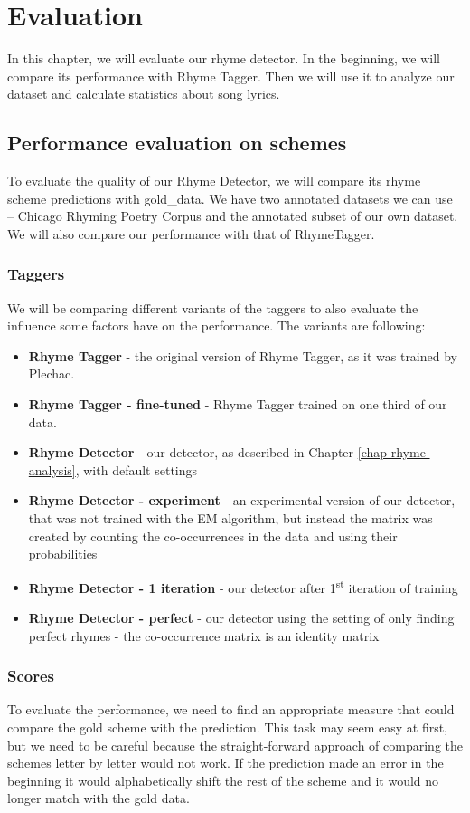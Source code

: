 \chapter{Evaluation}\label{evaluation}
In this chapter, we will evaluate our rhyme detector. In the beginning, we will compare its performance with Rhyme Tagger. Then we will use it to analyze our dataset and calculate statistics about song lyrics.

\section{Performance evaluation on schemes}
To evaluate the quality of our Rhyme Detector, we will compare its rhyme scheme predictions with \gls{gold_data}. We have two annotated datasets we can use -- Chicago Rhyming Poetry Corpus and  the annotated subset of our own dataset. We will also compare our performance with that of RhymeTagger.

\subsection{Taggers}
We will be comparing different variants of the taggers to also evaluate the influence some factors have on the performance. The variants are following:
\begin{itemize}
	\item \textbf{Rhyme Tagger} - the original version of Rhyme Tagger, as it was trained by Plechac.
	\item \textbf{Rhyme Tagger - fine-tuned} - Rhyme Tagger trained on one third of our data.
	\item \textbf{Rhyme Detector} - our detector, as described in Chapter \ref{chap-rhyme-analysis}, with default settings
	\item \textbf{Rhyme Detector - experiment} - an experimental version of our detector, that was not trained with the EM algorithm, but instead the matrix was created by counting the co-occurrences in the data and using their probabilities
	\item \textbf{Rhyme Detector - 1 iteration} - our detector after 1\textsuperscript{st} iteration of training
	\item \textbf{Rhyme Detector - perfect} - our detector using the setting of only finding perfect rhymes - the co-occurrence matrix is an identity matrix
\end{itemize}

\subsection{Scores}
To evaluate the performance, we need to find an appropriate measure that could compare the gold scheme with the prediction. This task may seem easy at first, but we need to be careful because the straight-forward approach of comparing the schemes letter by letter would not work. If the prediction made an error in the beginning it would alphabetically shift the rest of the scheme and it would no longer match with the gold data.

